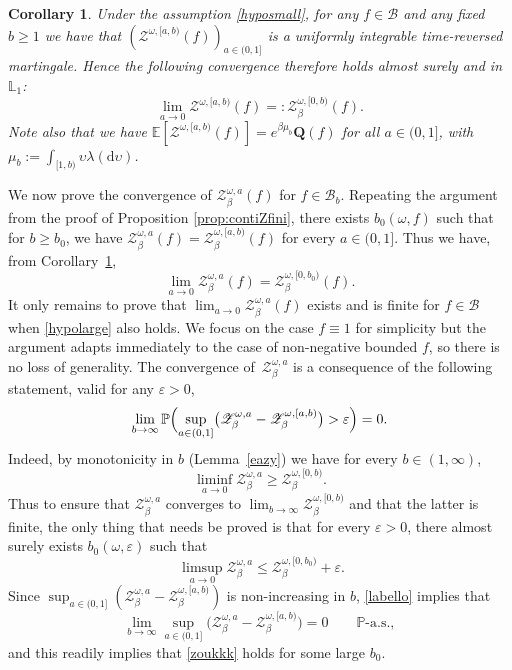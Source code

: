 \documentclass[10pt]{amsart}
\let\mathcal\mathscr
\newtheorem{cor}[theorem]{Corollary}
\theoremstyle{definition}
\newcommand{\dd}{\mathrm{d}}
\newcommand{\cB}{{\ensuremath{\mathcal B}} }
\newcommand{\cZ}{{\ensuremath{\mathcal Z}} }
\newcommand{\bQ}{{\ensuremath{\mathbf Q}} }
\newcommand{\bbE}{{\ensuremath{\mathbb E}} }
\newcommand{\bbL}{{\ensuremath{\mathbb L}} }
\newcommand{\bbP}{{\ensuremath{\mathbb P}} }
\let\gb\beta
\let\gep\varepsilon
\let\ups\upsilon
\let\go\omega
\begin{document}
\begin{cor}\label{lem:gene}
Under the assumption \eqref{hyposmall}, for any $f\in \cB$ and any fixed $b\geq 1$ we have that $(\cZ^{\go,[a,b)}(f))_{a\in(0,1]}$ is a uniformly integrable time-reversed martingale.
Hence the following convergence therefore holds almost surely and in $\bbL_1$:
\[
\lim_{a\to 0}\cZ^{\go,[a,b)}(f) =:\cZ^{\go,[0,b)}_\beta(f).
\]
Note also that we have $\bbE[ \cZ^{\go,[a,b)}(f) ] = e^{\gb \mu_b} \bQ(f)$ for all $a\in (0,1]$, with $\mu_b:= \int_{[1,b)} \ups \lambda(\dd \ups)$.
\end{cor}
We now prove the convergence of $\cZ^{\go,a}_\beta(f)$ for $f\in \cB_b$. Repeating the argument from the proof of Proposition \ref{prop:contiZfini}, there exists $b_0(\go,f)$ such that
for $b\ge b_0$, we have $\cZ^{\go,a}_\beta(f)=\cZ^{\go,[a,b)}_\beta(f)$ for every $a\in(0,1]$. Thus we have, from Corollary~\ref{lem:gene},
\begin{equation*}
\lim_{a\to 0}\cZ^{\go,a}_\beta(f)=\cZ^{\go,[0,b_0)}_\beta(f).
\end{equation*}
It only remains to prove that $\lim_{a\to 0}\cZ^{\go,a}_{\beta}(f)$ exists and is finite for $f\in \mathcal B$ when \eqref{hypolarge} also holds. We focus on the case $f\equiv 1$ for simplicity but the argument adapts immediately to the case of non-negative bounded $f$, so there is no loss of generality.
The convergence of~$\cZ^{\go,a}_\beta$ is a consequence of the following statement, valid
for any $\gep>0$,
\begin{equation}\label{labello}
\lim_{b\to \infty} \bbP\Bigl(\sup_{a\in(0,1]}\bigl(\cZ^{\go,a}_\beta - \cZ^{\go,[a,b)}_\beta\bigr) >\gep \Bigr) = 0.
\end{equation}
Indeed, by monotonicity in $b$ (\cf Lemma~\ref{eazy}) we have for every $b\in (1,\infty)$,
\[
\liminf_{a\to 0}\cZ^{\go,a}_\beta \ge
\cZ^{\go,[0,b)}_\beta.
\] Thus to ensure that $\cZ^{\go,a}_\beta$ converges to $\lim_{b\to \infty}\cZ^{\go,[0,b)}_\beta$ and that the latter is finite,
the only thing that needs be proved is that for every $\gep>0$, there almost surely exists $b_0(\go,\gep)$ such that
\begin{equation}\label{zoukkk}
\ \limsup_{a\to 0}\cZ^{\go,a}_\beta \le \cZ^{\go,[0,b_0)}_\beta+\gep.
\end{equation}
Since $\sup_{a\in(0,1]}(\cZ^{\go,a}_\beta - \cZ^{\go,[a,b)}_\beta)$ is non-increasing in $b$,
\eqref{labello} implies that
\begin{equation}
\label{labellobis}
\lim_{b\to\infty} \sup_{a\in(0,1]}\bigl(\cZ^{\go,a}_\beta - \cZ^{\go,[a,b)}_\beta \bigr) =0 \qquad \bbP\text{-a.s.},
\end{equation}
and this readily implies that \eqref{zoukkk} holds for some large $b_0$.
\end{document}
